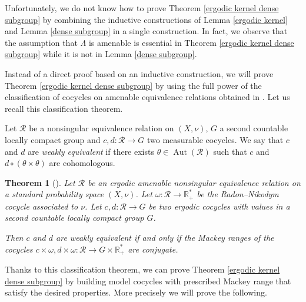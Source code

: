 \documentclass[a4paper,11pt]{amsart}
\numberwithin{equation}{section}
\newtheorem{theorem}{Theorem}[section]
\theoremstyle{definition}
\newcommand{\R}{\mathbb{R}}
\newcommand{\Aut}{\operatorname{Aut}}
\newcommand{\cR}{\mathcal{R}}
\begin{document}
Unfortunately, we do not know how to prove Theorem \ref{ergodic kernel dense subgroup} by combining the inductive constructions of Lemma \ref{ergodic kernel} and Lemma \ref{dense subgroup} in a single construction. In fact, we observe that the assumption that $\Lambda$ is amenable is essential in Theorem \ref{ergodic kernel dense subgroup} while it is not in Lemma \ref{dense subgroup}.

Instead of a direct proof based on an inductive construction, we will prove Theorem \ref{ergodic kernel dense subgroup} by using the full power of the classification of cocycles on amenable equivalence relations obtained in \cite{GS91}. Let us recall this classification theorem.



Let $\cR$ be a nonsingular equivalence relation on $(X,\nu)$, $G$ a second countable locally compact group and $c, d :  \cR \rightarrow G$ two measurable cocycles. 
We say that $c$ and $d$ are {\em weakly equivalent} if there exists $\theta \in\Aut(\mathcal R)$ such that $c$ and $d \circ (\theta \times \theta)$ are cohomologous.


\begin{theorem}[{\cite[Theorem 3.1]{GS91}}] \label{classification of cocycles}
Let $\cR$ be an ergodic amenable nonsingular equivalence relation on a standard probability space $(X, \nu)$. Let $\omega : \cR \rightarrow \R^*_+$ be the Radon--Nikodym cocycle associated to $\nu$. Let $c, d : \cR \rightarrow G$ be two ergodic cocycles with values in a second countable locally compact group $G$. 

Then $c$ and $d$ are weakly equivalent if and only if the Mackey ranges of the cocycles $c \times \omega, d \times \omega : \cR \rightarrow G \times \R^*_+$ are conjugate.
\end{theorem}

Thanks to this classification theorem, we can prove Theorem \ref{ergodic kernel dense subgroup} by building model cocycles with prescribed Mackey range that satisfy the desired properties. More precisely we will prove the following.
\end{document}

